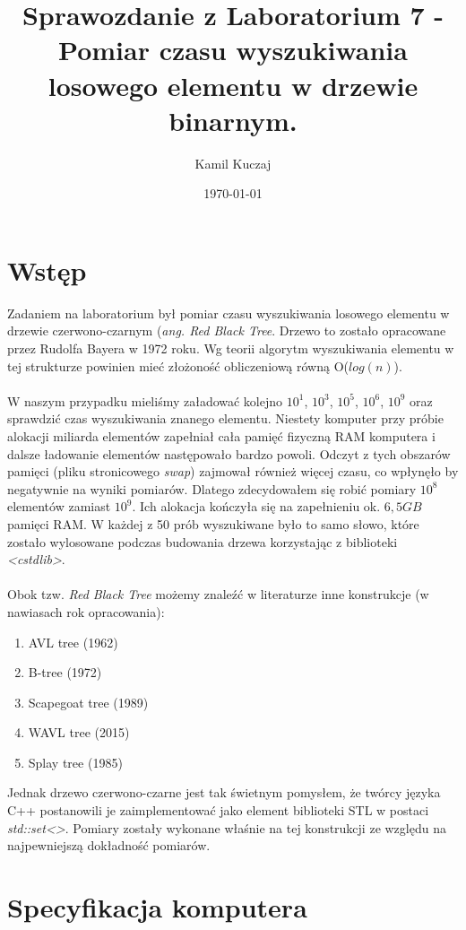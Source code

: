 \documentclass[11pt,a4paper]{article}
\author{Kamil Kuczaj}
\title{Sprawozdanie z Laboratorium 7 - Pomiar czasu wyszukiwania losowego elementu w drzewie binarnym.}
\date{\today}
\begin{document}
\maketitle

\section{Wstęp}
\hspace{4ex}Zadaniem na laboratorium był pomiar czasu wyszukiwania losowego elementu w drzewie czerwono-czarnym (\textit{ang. Red Black Tree}. Drzewo to zostało opracowane przez Rudolfa Bayera w 1972 roku. Wg teorii algorytm wyszukiwania elementu w tej strukturze powinien mieć złożoność obliczeniową równą O($log(n)$).\\\\W naszym przypadku mieliśmy załadować kolejno $10^1$, $10^3$, $10^5$, $10^6$, $10^9$ oraz sprawdzić czas wyszukiwania znanego elementu. Niestety komputer przy próbie alokacji miliarda elementów zapełniał cała pamięć fizyczną RAM komputera i dalsze ładowanie elementów następowało bardzo powoli. Odczyt z tych obszarów pamięci (pliku stronicowego \textit{swap}) zajmował również więcej czasu, co wpłynęło by negatywnie na wyniki pomiarów. Dlatego zdecydowałem się robić pomiary $10^8$ elementów zamiast $10^9$. Ich alokacja kończyła się na zapełnieniu ok. $6,5 GB$ pamięci RAM. W każdej z 50 prób wyszukiwane było to samo słowo, które zostało wylosowane podczas budowania drzewa korzystając z biblioteki \textit{<cstdlib>}.\\\\Obok tzw. \textit{Red Black Tree} możemy znaleźć w literaturze inne konstrukcje (w nawiasach rok opracowania):
\begin{enumerate}
\item AVL tree (1962)
\item B-tree (1972)
\item Scapegoat tree (1989)
\item WAVL tree (2015)
\item Splay tree (1985)
\end{enumerate}
\bigskip
Jednak drzewo czerwono-czarne jest tak świetnym pomysłem, że twórcy języka C++ postanowili je zaimplementować jako element biblioteki STL w postaci \textit{std::set<>}. Pomiary zostały wykonane właśnie na tej konstrukcji ze względu na najpewniejszą dokładność pomiarów.
\section{Specyfikacja komputera}
\end{document}
